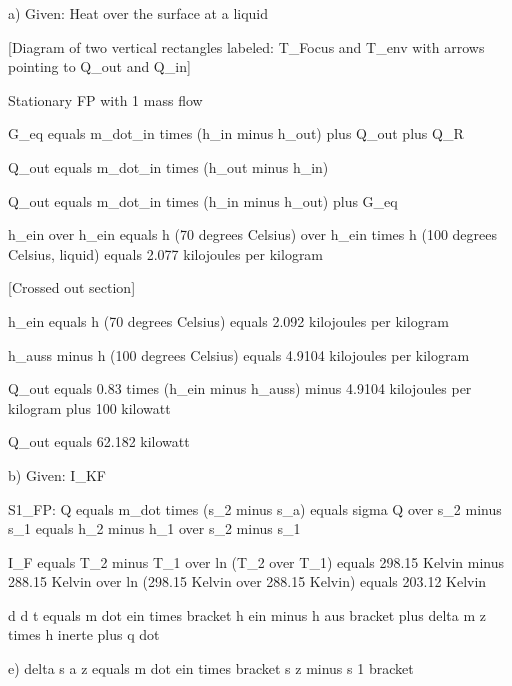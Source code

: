 a) Given: Heat over the surface at a liquid  

[Diagram of two vertical rectangles labeled: T_Focus and T_env with arrows pointing to Q_out and Q_in]  

Stationary FP with 1 mass flow  

G_eq equals m_dot_in times (h_in minus h_out) plus Q_out plus Q_R  

Q_out equals m_dot_in times (h_out minus h_in)  

Q_out equals m_dot_in times (h_in minus h_out) plus G_eq  

h_ein over h_ein equals h (70 degrees Celsius) over h_ein times h (100 degrees Celsius, liquid) equals 2.077 kilojoules per kilogram  

[Crossed out section]  

h_ein equals h (70 degrees Celsius) equals 2.092 kilojoules per kilogram  

h_auss minus h (100 degrees Celsius) equals 4.9104 kilojoules per kilogram  

Q_out equals 0.83 times (h_ein minus h_auss) minus 4.9104 kilojoules per kilogram plus 100 kilowatt  

Q_out equals 62.182 kilowatt  

b) Given: I_KF  

S1_FP: Q equals m_dot times (s_2 minus s_a) equals sigma Q over s_2 minus s_1 equals h_2 minus h_1 over s_2 minus s_1  

I_F equals T_2 minus T_1 over ln (T_2 over T_1) equals 298.15 Kelvin minus 288.15 Kelvin over ln (298.15 Kelvin over 288.15 Kelvin) equals 203.12 Kelvin

d d t equals m dot ein times bracket h ein minus h aus bracket plus delta m z times h inerte plus q dot

e) delta s a z equals m dot ein times bracket s z minus s 1 bracket